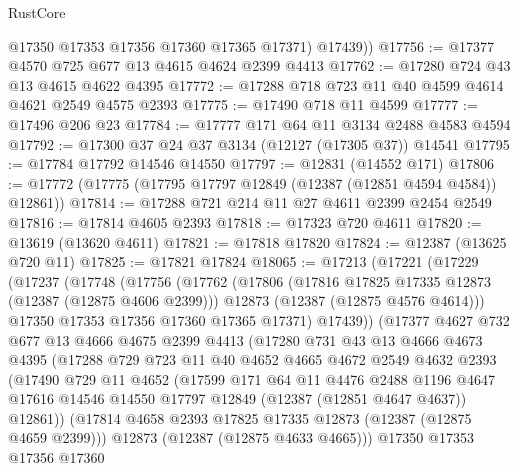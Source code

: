 \begin{lexlean}{RustCore}
\begin{coremodule}
          @17350
          @17353
          @17356
          @17360
          @17365
          @17371)
        @17439))
@17756 := @17377 @4570 @725 @677 @13 @4615 @4624 @2399 @4413
@17762 := @17280 @724 @43 @13 @4615 @4622 @4395
@17772 := @17288 @718 @723 @11 @40 @4599 @4614 @4621 @2549 @4575 @2393
@17775 := @17490 @718 @11 @4599
@17777 := @17496 @206 @23
@17784 := @17777 @171 @64 @11 @3134 @2488 @4583 @4594
@17792 := @17300 @37 @24 @37 @3134 (@12127 (@17305 @37)) @14541
@17795 := @17784 @17792 @14546 @14550
@17797 := @12831 (@14552 @171)
@17806 := @17772 (@17775 (@17795 @17797 @12849 (@12387 (@12851 @4594 @4584)) @12861))
@17814 := @17288 @721 @214 @11 @27 @4611 @2399 @2454 @2549
@17816 := @17814 @4605 @2393
@17818 := @17323 @720 @4611
@17820 := @13619 (@13620 @4611)
@17821 := @17818 @17820
@17824 := @12387 (@13625 @720 @11)
@17825 := @17821 @17824
@18065 := @17213
    (@17221
      (@17229
        (@17237
          (@17748
            (@17756
              (@17762
                (@17806
                  (@17816 @17825 @17335 @12873 (@12387 (@12875 @4606 @2399)))
                  @12873
                  (@12387 (@12875 @4576 @4614)))
                @17350
                @17353
                @17356
                @17360
                @17365
                @17371)
              @17439))
          (@17377
            @4627
            @732
            @677
            @13
            @4666
            @4675
            @2399
            @4413
            (@17280
              @731
              @43
              @13
              @4666
              @4673
              @4395
              (@17288
                @729
                @723
                @11
                @40
                @4652
                @4665
                @4672
                @2549
                @4632
                @2393
                (@17490
                  @729
                  @11
                  @4652
                  (@17599
                    @171
                    @64
                    @11
                    @4476
                    @2488
                    @1196
                    @4647
                    @17616
                    @14546
                    @14550
                    @17797
                    @12849
                    (@12387 (@12851 @4647 @4637))
                    @12861))
                (@17814 @4658 @2393 @17825 @17335 @12873 (@12387 (@12875 @4659 @2399)))
                @12873
                (@12387 (@12875 @4633 @4665)))
              @17350
              @17353
              @17356
              @17360

\end{coremodule}
\end{lexlean}
